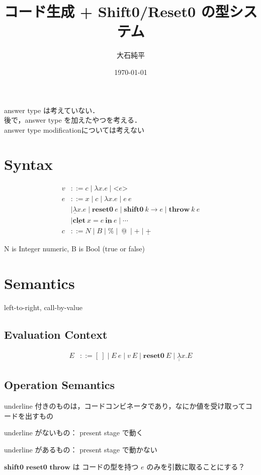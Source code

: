 \documentclass[10pt,a4j]{jarticle}
\title{コード生成 + Shift0/Reset0 の型システム}
\date{\today}
\author{大石純平}
\makeatletter
\newcommand\fun[2]{\lambda{#1}.{#2}}
\newcommand\Resetz{\textbf{reset0}}
\newcommand\Shiftz{\textbf{shift0}}
\newcommand\Throw{\textbf{throw}}
\newcommand\resetz[1]{\Resetz~{#1}}
\newcommand\shiftz[2]{\Shiftz~{#1}\to{#2}}
\newcommand\throw[2]{\Throw~{#1}~{#2}}
\newcommand\cfun[2]{\underline{\lambda}{#1}.{#2}}
\newcommand\ccfun[2]{\underline{\underline{\lambda}}{#1}.{#2}}
\newcommand\cPlus{\underline{\textbf{+}}}
\newcommand\cLet{\underline{\textbf{clet}}}
\newcommand\cIn{\underline{\textbf{in}}}
\newcommand\clet[3]{\cLet~{#1}={#2}~\cIn~{#3}}
\newcommand\csp[1]{\texttt{\%}{#1}}
\newcommand\code[1]{\texttt{<}{#1}\texttt{>}}
\newcommand\cat{~\underline{@}~}
\makeatother
\begin{document}
\maketitle

answer type は考えていない．\\
後で，answer type を加えたやつを考える．\\
answer type modificationについては考えない

\section{Syntax}
\begin{align*}
  v & ::= c \mid \fun{x}{e} \mid \code{e} \\
  e & ::=  x \mid c \mid \fun{x}{e} \mid e~e \\
    & \mid \cfun{x}{e}
      \mid \resetz{e}
      \mid \shiftz{k}{e}
      \mid \throw{k}{e} \\
    & \mid \clet{x}{e}{e}
      \mid \cdots \\
  c & ::= N \mid B \mid \csp \mid \cat \mid + \mid \cPlus
\end{align*}

N is Integer numeric, B is Bool (true or false)

\section{Semantics}
left-to-right, call-by-value

\subsection{Evaluation Context}

\begin{align*}
  E & ::= [~] \mid E~ e \mid v~ E \mid \Resetz~ E \mid \ccfun{x}{E}
\end{align*}

\subsection{Operation Semantics}
underline 付きのものは，コードコンビネータであり，なにか値を受け取ってコードを出すもの

underline がないもの： present stage で動く

underline があるもの： present stage で動かない

$\Shiftz$ $\Resetz$ $\Throw$ は コードの型を持つ $e$ のみを引数に取ることにする？
\end{document}
